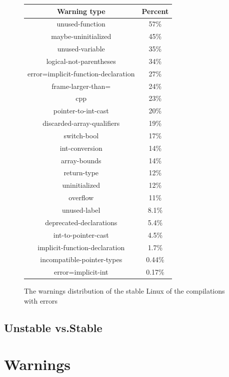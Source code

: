 \documentclass[a4paper,11pt]{report}
\newcommand{\figa}{
    \begin{figure}[!htpb]
    \centering
}
\newcommand{\figb}[2]{
    \caption{#1}
    \label{#2}
    \end{figure}
}
\begin{document}
\figa
    \begin{tabular}{c|c}
        \hline 
        \hline

        \textbf{Warning type} & \textbf{Percent} \\

        \hline

        unused-function & 57\% \\
        maybe-uninitialized & 45\% \\
        unused-variable & 35\% \\
        logical-not-parentheses & 34\% \\
        error=implicit-function-declaration & 27\% \\
        frame-larger-than= & 24\% \\
        cpp & 23\% \\
        pointer-to-int-cast & 20\% \\
        discarded-array-qualifiers & 19\% \\
        switch-bool & 17\% \\
        int-conversion & 14\% \\
        array-bounds & 14\% \\
        return-type & 12\% \\
        uninitialized & 12\% \\
        overflow & 11\% \\
        unused-label & 8.1\% \\
        deprecated-declarations & 5.4\% \\
        int-to-pointer-cast & 4.5\% \\
        implicit-function-declaration & 1.7\% \\
        incompatible-pointer-types & 0.44\% \\
        error=implicit-int & 0.17\% \\

        \hline 
        \hline
    \end{tabular}
\figb{The warnings distribution of the stable Linux of the compilations with 
    errors}{tab:stablewarnwitherrs}


    \subsection{Unstable vs.Stable}


    \section{Warnings}
\end{document}
